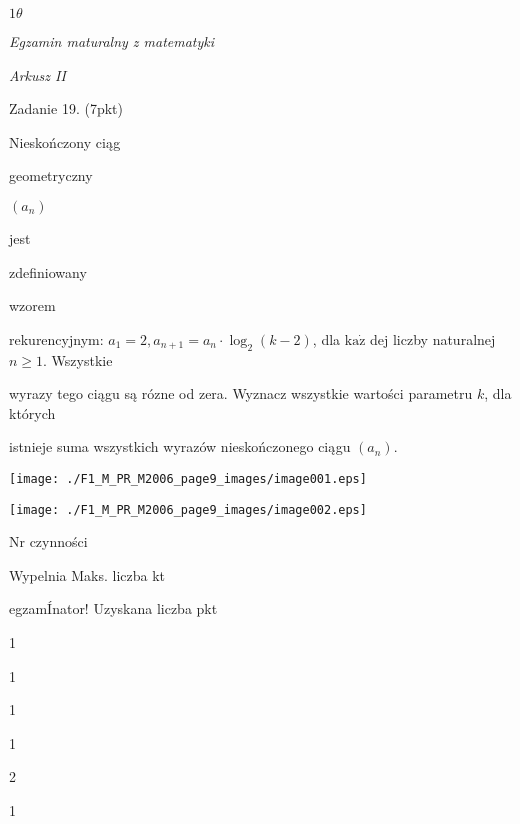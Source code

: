 \documentclass[a4paper,12pt]{article}
\begin{document}
$ 1\theta$

{\it Egzamin maturalny z matematyki}

{\it Arkusz II}

Zadanie 19. (7pkt)

Nieskończony ciąg

geometryczny

$(a_{n})$

jest

zdefiniowany

wzorem

rekurencyjnym: $a_{1}=2, a_{n+1}=a_{n}\cdot\log_{2}(k-2)$, dla $\mathrm{k}\mathrm{a}\dot{\mathrm{z}}$ dej liczby naturalnej $n\geq 1$. Wszystkie

wyrazy tego ciągu są rózne od zera. Wyznacz wszystkie wartości parametru $k$, dla których

istnieje suma wszystkich wyrazów nieskończonego ciągu $(a_{n}).$
\begin{center}
\texttt{[image: ./F1\_M\_PR\_M2006\_page9\_images/image001.eps]}

\texttt{[image: ./F1\_M\_PR\_M2006\_page9\_images/image002.eps]}
\end{center}
Nr czynności

Wypelnia Maks. liczba kt

egzamÍnator! Uzyskana liczba pkt

1

1

1

1

2

1
\end{document}
